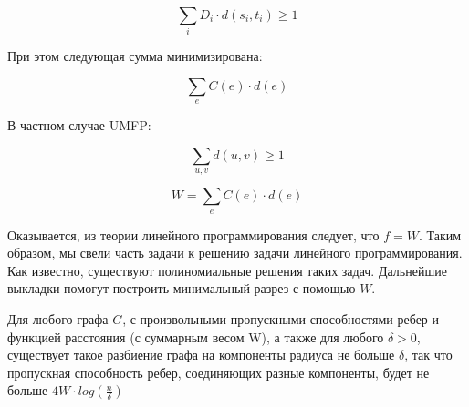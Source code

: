 \documentclass[12pt]{article} %
\begin{document}
$$\underset{i}{\sum} D_i \cdot d(s_i, t_i) \geq 1$$

При этом следующая сумма минимизирована:

$$\underset{e}{\sum} C(e) \cdot d(e)$$

В частном случае UMFP:

$$\underset{u, v}{\sum} d(u, v) \geq 1$$

$$W = \underset{e}{\sum} C(e) \cdot d(e)$$

Оказывается, из теории линейного программирования следует, что $f = W$. Таким образом, мы свели часть задачи к решению задачи линейного программирования. Как известно, существуют полиномиальные решения таких задач. Дальнейшие выкладки помогут построить минимальный разрез с помощью $W$.

\begin{Lemma}
    Для любого графа $G$, с произвольными пропускными способностями ребер и функцией расстояния (с суммарным весом W), а также для любого $\delta > 0$, существует такое разбиение графа на компоненты радиуса не больше $\delta$, так что пропускная способность ребер, соединяющих разные компоненты, будет не больше $4W \cdot log(\frac{n}{\delta})$
\end{Lemma}
\end{document}
